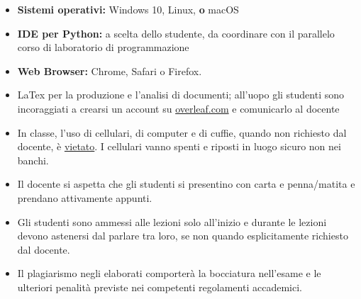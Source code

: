 \documentclass[11pt, a4paper]{article}
\begin{document}
\vspace{.4cm}

\begin{itemize}[itemsep=2pt,parsep=0pt,topsep=2pt,partopsep=2pt]
	\item[\color{darkblue}\faLaptopCode] \textbf{Sistemi operativi:} \faWindows {} Windows  10,  \faLinux {} Linux, \textcolor{vanierred}{\textbf{o}} \faApple {} macOS 
	\item[\color{darkblue}\faCode] \textbf{IDE per Python:} \faUnity a scelta dello studente, da coordinare con il parallelo corso di laboratorio di programmazione
	\item [{\color{darkblue}\faChrome}] \textbf{Web Browser:} Chrome, Safari o Firefox.   
	\item[{\color{darkblue} \faWpforms}] LaTex per la produzione e l'analisi di documenti; all'uopo gli studenti sono incoraggiati a crearsi un account su \url{overleaf.com} e comunicarlo al docente
\end{itemize}   

\begin{itemize}[itemsep=2.5pt,parsep=0pt,topsep=8pt,partopsep=4pt]
	\item[{ \color{darkblue} \faLaptop \faMobile \faHeadphones}] In classe, l'uso di cellulari, di computer e di cuffie, quando non richiesto dal docente, \`{e}  \underline{vietato}. I cellulari vanno spenti e riposti in luogo sicuro non nei banchi.
	
	\item[{\color{darkblue} \faEdit}] Il docente si aspetta che gli studenti si presentino con carta e penna/matita e prendano attivamente appunti.
	\item[{\color{darkblue} \faRocketchat}] Gli studenti sono ammessi alle lezioni solo all'inizio e durante le lezioni devono astenersi dal parlare tra loro, se non quando esplicitamente richiesto dal docente.
	
	\item[{\color{darkred} \faThumbsDown}] Il plagiarismo negli elaborati comporter\`{a} la bocciatura nell'esame e le ulteriori penalit\`{a} previste nei competenti regolamenti accademici.
\end{itemize}

\end{document}
